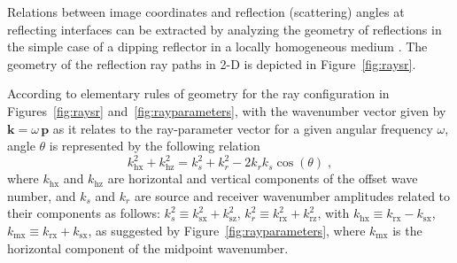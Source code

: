 Relations between image coordinates and reflection (scattering) angles
at reflecting interfaces can be extracted by analyzing the geometry of
reflections in the simple case of a dipping reflector in a locally
homogeneous medium \cite[]{SEG-2004-10531056}.  The geometry of the
reflection ray paths in 2-D is depicted in Figure~\ref{fig:raysr}.

According to elementary rules of geometry for the ray configuration in
Figures~\ref{fig:raysr} and~\ref{fig:rayparameters}, with the
wavenumber vector given by $\mathbf{k} =\omega\,\mathbf{p}$ as it relates to the
ray-parameter vector for a given angular frequency $\omega$,  
 angle $\theta$ is represented by the following relation \cite[]{SEG-2004-10531056,coord}
\begin{equation}
  \label{eq:theta}
  k_{\text{hx}}^2+k_{\text{hz}}^2 = k_s^2+k_r^2 - 2 k_r k_s \cos (\theta )\;,
\end{equation}
where $k_{\text{hx}}$ and $k_{\text{hz}}$ are horizontal and vertical components of the offset
wave number, and $k_s$ and $k_r$ are source and receiver wavenumber amplitudes related to their components as follows:
$k_s^2 \equiv k_{\text{sx}}^2+k_{\text{sz}}^2$,
$k_r^2 \equiv k_{\text{rx}}^2+k_{\text{rz}}^2$,
with
$k_{\text{hx}} \equiv k_{\text{rx}} - k_{\text{sx}}$,
$k_{\text{mx}} \equiv k_{\text{rx}} + k_{\text{sx}}$,
as suggested by Figure~\ref{fig:rayparameters}, where $k_{\text{mx}}$ is the horizontal component of the midpoint wavenumber.

